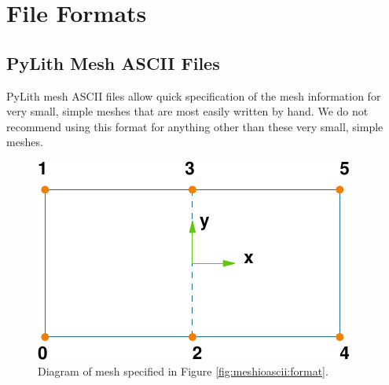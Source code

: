 
\chapter{\label{cha:File-Formats}File Formats}


\section{\label{sec:MeshIOAscii}PyLith Mesh ASCII Files}

PyLith mesh ASCII files allow quick specification of the mesh information
for very small, simple meshes that are most easily written by hand.
We do not recommend using this format for anything other than these
very small, simple meshes.

\noindent \begin{center}
\begin{figure}[H]
\noindent \begin{centering}
\includegraphics{fileformats/figs/meshquad4}
\par\end{centering}

\caption{Diagram of mesh specified in Figure \ref{fig:meshioascii:format}.\label{fig:meshioascii:diagram}}
\end{figure}

\par\end{center}
